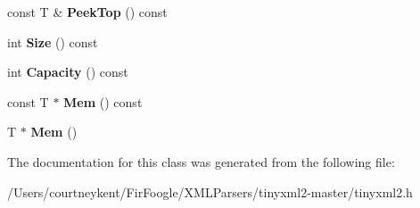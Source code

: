 \begin{DoxyCompactItemize}
\item 
\hypertarget{classtinyxml2_1_1_dyn_array_a9c2282ea8901b5a92ccaac2e6166a788}{const T \& {\bfseries Peek\+Top} () const }\label{classtinyxml2_1_1_dyn_array_a9c2282ea8901b5a92ccaac2e6166a788}

\item 
\hypertarget{classtinyxml2_1_1_dyn_array_a1299b257b62ea6b4983c488867f219b0}{int {\bfseries Size} () const }\label{classtinyxml2_1_1_dyn_array_a1299b257b62ea6b4983c488867f219b0}

\item 
\hypertarget{classtinyxml2_1_1_dyn_array_a8edbe90ed53b2e46b1b5cf53b261e4e7}{int {\bfseries Capacity} () const }\label{classtinyxml2_1_1_dyn_array_a8edbe90ed53b2e46b1b5cf53b261e4e7}

\item 
\hypertarget{classtinyxml2_1_1_dyn_array_a1f39330daeb97d3d1dc3fc12dcf7ac67}{const T $\ast$ {\bfseries Mem} () const }\label{classtinyxml2_1_1_dyn_array_a1f39330daeb97d3d1dc3fc12dcf7ac67}

\item 
\hypertarget{classtinyxml2_1_1_dyn_array_a0e0d60b399d54fad5b33d5008bc59c8e}{T $\ast$ {\bfseries Mem} ()}\label{classtinyxml2_1_1_dyn_array_a0e0d60b399d54fad5b33d5008bc59c8e}

\end{DoxyCompactItemize}


The documentation for this class was generated from the following file\+:\begin{DoxyCompactItemize}
\item 
/\+Users/courtneykent/\+Fir\+Foogle/\+X\+M\+L\+Parsers/tinyxml2-\/master/tinyxml2.\+h\end{DoxyCompactItemize}

